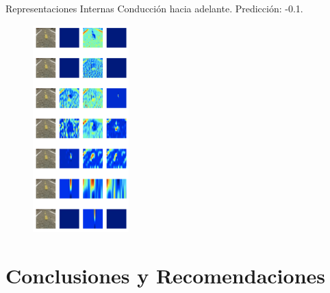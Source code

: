 \documentclass[10pt]{beamer}
\begin{document}
\begin{frame}{Representaciones Internas}
    Conducción hacia adelante. Predicción: \alert{-0.1}.
    \begin{figure}[!h] 
        \centering
        \includegraphics[width=0.33\textwidth]{../img/predade}
    \end{figure}
\end{frame}

\section{Conclusiones y Recomendaciones}
\end{document}
